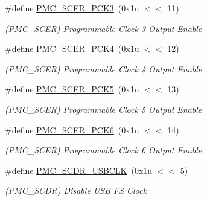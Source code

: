 \begin{DoxyCompactItemize}
\#define \mbox{\hyperlink{group__SAME70__PMC_gad4a2c7840a746ac64b9bed22ff683572}{P\+M\+C\+\_\+\+S\+C\+E\+R\+\_\+\+P\+C\+K3}}~(0x1u $<$$<$ 11)
\begin{DoxyCompactList}\small\item\em (P\+M\+C\+\_\+\+S\+C\+ER) Programmable Clock 3 Output Enable \end{DoxyCompactList}\item 
\mbox{\label{group__SAME70__PMC_ga439a7f068f5851a2545663aafd715301}} 
\#define \mbox{\hyperlink{group__SAME70__PMC_ga439a7f068f5851a2545663aafd715301}{P\+M\+C\+\_\+\+S\+C\+E\+R\+\_\+\+P\+C\+K4}}~(0x1u $<$$<$ 12)
\begin{DoxyCompactList}\small\item\em (P\+M\+C\+\_\+\+S\+C\+ER) Programmable Clock 4 Output Enable \end{DoxyCompactList}\item 
\mbox{\label{group__SAME70__PMC_ga9c510d90dec2ff15e317fa10d74d8957}} 
\#define \mbox{\hyperlink{group__SAME70__PMC_ga9c510d90dec2ff15e317fa10d74d8957}{P\+M\+C\+\_\+\+S\+C\+E\+R\+\_\+\+P\+C\+K5}}~(0x1u $<$$<$ 13)
\begin{DoxyCompactList}\small\item\em (P\+M\+C\+\_\+\+S\+C\+ER) Programmable Clock 5 Output Enable \end{DoxyCompactList}\item 
\mbox{\label{group__SAME70__PMC_ga9a55e8adfd2f36577018f765a62e2885}} 
\#define \mbox{\hyperlink{group__SAME70__PMC_ga9a55e8adfd2f36577018f765a62e2885}{P\+M\+C\+\_\+\+S\+C\+E\+R\+\_\+\+P\+C\+K6}}~(0x1u $<$$<$ 14)
\begin{DoxyCompactList}\small\item\em (P\+M\+C\+\_\+\+S\+C\+ER) Programmable Clock 6 Output Enable \end{DoxyCompactList}\item 
\mbox{\label{group__SAME70__PMC_gaf181035ac0c43413fd5a5c42fb3ee734}} 
\#define \mbox{\hyperlink{group__SAME70__PMC_gaf181035ac0c43413fd5a5c42fb3ee734}{P\+M\+C\+\_\+\+S\+C\+D\+R\+\_\+\+U\+S\+B\+C\+LK}}~(0x1u $<$$<$ 5)
\begin{DoxyCompactList}\small\item\em (P\+M\+C\+\_\+\+S\+C\+DR) Disable U\+SB FS Clock \end{DoxyCompactList}\item 
$$
\end{DoxyCompactItemize}
